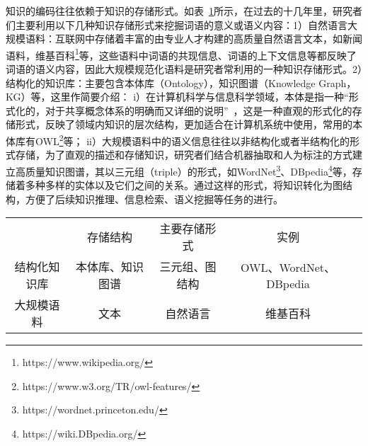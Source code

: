 知识的编码往往依赖于知识的存储形式。如表~\ref{knowledge-base}所示，在过去的十几年里，研究者们主要利用以下几种知识存储形式来挖掘词语的意义或语义内容：1）自然语言大规模语料：互联网中存储着丰富的由专业人才构建的高质量自然语言文本，如新闻语料，维基百科\footnote{https://www.wikipedia.org/}等，这些语料中词语的共现信息、词语的上下文信息等都反映了词语的语义内容，因此大规模规范化语料是研究者常利用的一种知识存储形式。2）结构化的知识库：主要包含本体库（Ontology），知识图谱（Knowledge Graph，KG）等，这里作简要介绍：
%
i）在计算机科学与信息科学领域，本体是指一种“形式化的，对于共享概念体系的明确而又详细的说明”~\cite{ka/GRUBER1993199}，这是一种直观的形式化的存储形式，反映了领域内知识的层次结构，更加适合在计算机系统中使用，常用的本体库有OWL\footnote{https://www.w3.org/TR/owl-features/}等；
%
ii）大规模语料中的语义信息往往以非结构化或者半结构化的形式存储，为了直观的描述和存储知识，研究者们结合机器抽取和人为标注的方式建立高质量知识图谱，其以三元组（triple）的形式，如WordNet\footnote{https://wordnet.princeton.edu/}、DBpedia\footnote{https://wiki.DBpedia.org/}等，存储着多种多样的实体以及它们之间的关系。通过这样的形式，将知识转化为图结构，方便了后续知识推理、信息检索、语义挖掘等任务的进行。

\begin{table}[!ht]
    \center
    \vspace{5pt}
    \begin{tabular}{|c|c|c|c|l}
        \cline{1-4}
            & 存储结构 & 主要存储形式 & 实例 & \\ \cline{1-4}
        结构化知识库 & 本体库、知识图谱 & 三元组、图结构 & OWL、WordNet、DBpedia & \\ \cline{1-4}
        大规模语料 & 文本 & 自然语言 & 维基百科 & \\ \cline{1-4}
    \end{tabular}
    \label{knowledge-base}
\end{table}


